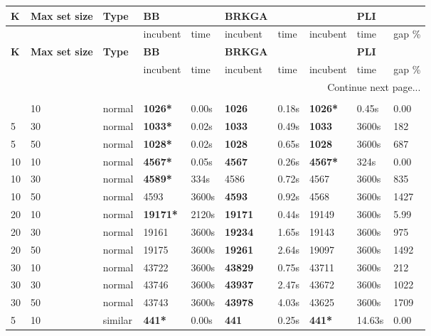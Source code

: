 \begin{scriptsize}
\setlength\LTleft{0pt}            %
\setlength\LTright{0pt}           %
\label{table:tests}
\begin{longtable}{@{\extracolsep{\fill}}l|l|l|ll|ll|lll@{}}
\hline
\textbf{K} & \textbf{Max set size} & \textbf{Type} & \textbf{BB} & & \textbf{BRKGA} & & & \textbf{PLI}\\ 
\hline
& & & incubent & time & incubent & time & incubent & time & gap \%\\ 
\hline
\endfirsthead
\hline
\textbf{K} & \textbf{Max set size} & \textbf{Type} & \textbf{BB} & & \textbf{BRKGA} & & & \textbf{PLI}\\ 
\hline
& & & incubent & time & incubent & time & incubent & time & gap \%\\ 
\hline
\endhead
\hline \multicolumn{10}{r}{{Continue next page...}} \\ 
\endfoot
\multicolumn{10}{r}{{}} \\ 
\endlastfoot
 5 & 10 & normal& \textbf{1026*}& 0.00s& \textbf{1026}& 0.18s & \textbf{1026*}& 0.45s & 0.00 \\
 5 & 30 & normal& \textbf{1033*}& 0.02s& \textbf{1033}& 0.49s & \textbf{1033}& 3600s& 182 \\
 5 & 50 & normal& \textbf{1028*}& 0.02s& \textbf{1028}& 0.65s & \textbf{1028}& 3600s& 687 \\
 10 & 10 & normal& \textbf{4567*}& 0.05s& \textbf{4567}& 0.26s & \textbf{4567*}& 324s & 0.00 \\
 10 & 30 & normal& \textbf{4589*}& 334s & 4586& 0.72s & 4567& 3600s& 835 \\
 10 & 50 & normal& 4593& 3600s& \textbf{4593}& 0.92s & 4568& 3600s& 1427 \\
 20 & 10 & normal& \textbf{19171*}& 2120s & \textbf{19171}& 0.44s & 19149& 3600s& 5.99 \\
 20 & 30 & normal& 19161& 3600s& \textbf{19234}& 1.65s & 19143& 3600s& 975 \\
 20 & 50 & normal& 19175& 3600s& \textbf{19261}& 2.64s & 19097& 3600s& 1492 \\
 30 & 10 & normal& 43722& 3600s& \textbf{43829}& 0.75s & 43711& 3600s& 212 \\
 30 & 30 & normal& 43746& 3600s& \textbf{43937}& 2.47s & 43672& 3600s& 1022 \\
 30 & 50 & normal& 43743& 3600s& \textbf{43978}& 4.03s & 43625& 3600s& 1709 \\
 5 & 10 & similar& \textbf{441*}& 0.00s& \textbf{441}& 0.25s & \textbf{441*}& 14.63s & 0.00 \\

\end{longtable}
\end{scriptsize}
